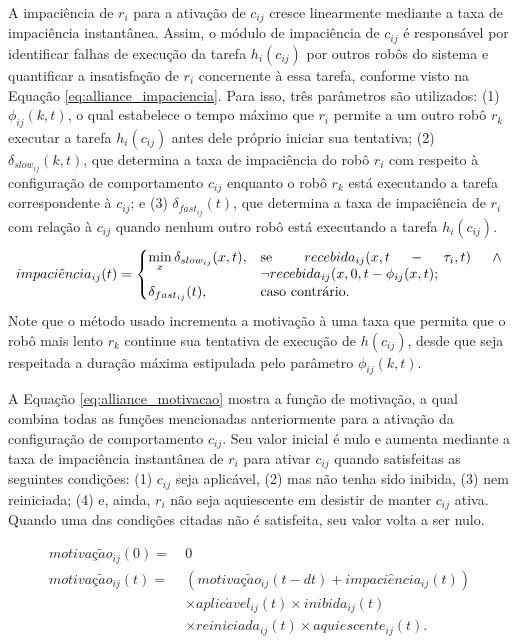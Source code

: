         A impaciência de $r_i$ para a ativação de $c_{ij}$ cresce linearmente mediante a taxa de impaciência instantânea. Assim, o módulo de impaciência de $c_{ij}$ é responsável por identificar falhas de execução da tarefa $h_i(c_{ij})$ por outros robôs do sistema e quantificar a insatisfação de $r_i$ concernente à essa tarefa, conforme visto na Equação \ref{eq:alliance_impaciencia}. Para isso, três parâmetros são utilizados: (1) $\phi_{ij}(k, t)$, o qual estabelece o tempo máximo que $r_i$ permite a um outro robô $r_k$ executar a tarefa $h_i(c_{ij})$ antes dele próprio iniciar sua tentativa; (2) $\delta_{slow_{ij}}(k, t)$, que determina a taxa de impaciência do robô $r_i$ com respeito à configuração de comportamento $c_{ij}$ enquanto o robô $r_k$ está executando a tarefa correspondente à $c_{ij}$; e (3) $\delta_{fast_{ij}}(t)$, que determina a taxa de impaciência de $r_i$ com relação à $c_{ij}$ quando nenhum outro robô está executando a tarefa $h_i(c_{ij})$.
        \begin{equation} \label{eq:alliance_impaciencia}
            impaci\hat{e}ncia_{ij}(t) =
            \begin{cases}
                \min\limits_{x}\delta_{slow_{ij}}(x, t), & \parbox[t]{.5\textwidth}{se $recebida_{ij}(x, t - \tau_i, t) \land \lnot recebida_{ij}(x, 0, t - \phi_{ij}(x, t)$;} \\
                \delta_{fast_{ij}}(t), & \text{caso contrário.}
            \end{cases}
        \end{equation}
        Note que o método usado incrementa a motivação à uma taxa que permita que o robô mais lento $r_k$ continue sua tentativa de execução de $h(c_{ij})$, desde que seja respeitada a duração máxima estipulada pelo parâmetro $\phi_{ij}(k, t)$.
        
        A Equação \ref{eq:alliance_motivacao} mostra a função de motivação, a qual combina todas as funções mencionadas anteriormente para a ativação da configuração de comportamento $c_{ij}$. Seu valor inicial é nulo e aumenta mediante a taxa de impaciência instantânea de $r_i$ para ativar $c_{ij}$ quando satisfeitas as seguintes condições: (1) $c_{ij}$ seja aplicável, (2) mas não tenha sido inibida, (3) nem reiniciada; (4) e, ainda, $r_i$ não seja aquiescente em desistir de manter $c_{ij}$ ativa. Quando uma das condições citadas não é satisfeita, seu valor volta a ser nulo. 
        
        \begin{equation} \label{eq:alliance_motivacao}
            \begin{aligned}
                motiva\textit{ç}\tilde{a}o_{ij}(0) = \ & 0 \\
                motiva\textit{ç}\tilde{a}o_{ij}(t) = \ & (motiva\textit{ç}\tilde{a}o_{ij}(t - dt) + impaci\hat{e}ncia_{ij}(t)) \\
                & \times aplic\acute{a}vel_{ij}(t) \times inibida_{ij}(t) \\
                & \times reiniciada_{ij}(t) \times aquiescente_{ij}(t).
            \end{aligned}
        \end{equation}
        
